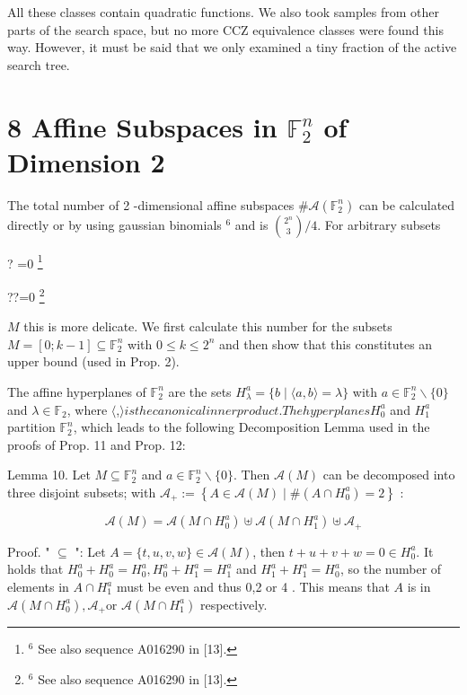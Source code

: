 \documentclass[10pt]{article}
\let\svthefootnote\thefootnote
\newcommand\blfootnotetext[1]{%
  \let\thefootnote\relax\footnote{#1}%
  \addtocounter{footnote}{-1}%
  \let\thefootnote\svthefootnote%
}
\let\svfootnotetext\footnotetext
\renewcommand\footnotetext[2][?]{%
  \if\relax#1\relax%
    \ifnum\value{footnote}=0\blfootnotetext{#2}\else\svfootnotetext{#2}\fi%
  \else%
    \if?#1\ifnum\value{footnote}=0\blfootnotetext{#2}\else\svfootnotetext{#2}\fi%
    \else\svfootnotetext[#1]{#2}\fi%
  \fi
}
\begin{document}
All these classes contain quadratic functions. We also took samples from other parts of the search space, but no more CCZ equivalence classes were found this way. However, it must be said that we only examined a tiny fraction of the active search tree.

\section*{8 Affine Subspaces in $\mathbb{F}_{2}^{n}$ of Dimension 2}
The total number of 2 -dimensional affine subspaces $\# \mathcal{A}\left(\mathbb{F}_{2}^{n}\right)$ can be calculated directly or by using gaussian binomials ${ }^{6}$ and is $\binom{2^{n}}{3} / 4$. For arbitrary subsets

$M$ this is more delicate. We first calculate this number for the subsets $M= [0 ; k-1] \subseteq \mathbb{F}_{2}^{n}$ with $0 \leq k \leq 2^{n}$ and then show that this constitutes an upper bound (used in Prop. 2).

The affine hyperplanes of $\mathbb{F}_{2}^{n}$ are the sets $H_{\lambda}^{a}=\{b \mid\langle a, b\rangle=\lambda\}$ with $a \in \mathbb{F}_{2}^{n} \backslash\{0\}$ and $\lambda \in \mathbb{F}_{2}$, where $\langle$,$\rangle is the canonical inner product. The hyperplanes H_{0}^{a}$ and $H_{1}^{a}$ partition $\mathbb{F}_{2}^{n}$, which leads to the following Decomposition Lemma used in the proofs of Prop. 11 and Prop. 12:

Lemma 10. Let $M \subseteq \mathbb{F}_{2}^{n}$ and $a \in \mathbb{F}_{2}^{n} \backslash\{0\}$. Then $\mathcal{A}(M)$ can be decomposed into three disjoint subsets; with $\mathcal{A}_{+}:=\left\{A \in \mathcal{A}(M) \mid \#\left(A \cap H_{0}^{a}\right)=2\right\}$ :


\begin{equation*}
\mathcal{A}(M)=\mathcal{A}\left(M \cap H_{0}^{a}\right) \uplus \mathcal{A}\left(M \cap H_{1}^{a}\right) \uplus \mathcal{A}_{+} \tag{16}
\end{equation*}


Proof. " $\subseteq$ ": Let $A=\{t, u, v, w\} \in \mathcal{A}(M)$, then $t+u+v+w=0 \in H_{0}^{a}$. It holds that $H_{0}^{a}+H_{0}^{a}=H_{0}^{a}, H_{0}^{a}+H_{1}^{a}=H_{1}^{a}$ and $H_{1}^{a}+H_{1}^{a}=H_{0}^{a}$, so the number of elements in $A \cap H_{1}^{a}$ must be even and thus 0,2 or 4 . This means that $A$ is in $\mathcal{A}\left(M \cap H_{0}^{a}\right), \mathcal{A}_{+}$or $\mathcal{A}\left(M \cap H_{1}^{a}\right)$ respectively.
\end{document}

